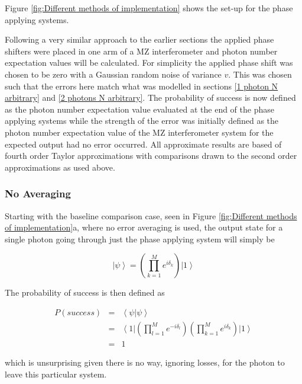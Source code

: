 \documentclass[aps,pra,twocolumn,superscriptaddress,numerical]{revtex4-1}
\begin{document}
		Figure \ref{fig:Different methods of implementation} shows the set-up for the phase applying systems.
		
		Following a very similar approach to the earlier sections the applied phase shifters were placed in one arm of a MZ interferometer and photon number expectation values will be calculated. For simplicity the applied phase shift was chosen to be zero with a Gaussian random noise of variance $v$. This was chosen such that the errors here match what was modelled in sections \ref{1 photon N arbitrary} and \ref{2 photons N arbitrary}. The probability of success is now defined as the photon number expectation value evaluated at the end of the phase applying systems while the strength of the error was initially defined as the photon number expectation value of the MZ interferometer system for the expected output had no error occurred. All approximate results are based of fourth order Taylor approximations with comparisons drawn to the second order approximations as used above.
		
		
		\subsubsection{No Averaging\label{No Averaging}}
		
		Starting with the baseline comparison case, seen in Figure \ref{fig:Different methods of implementation}a, where no error averaging is used, the output state for a single photon going through just the phase applying system will simply be
		
		\begin{equation}
		\left|\psi\right\rangle =\left(\prod_{k=1}^{M}e^{i\delta_{k}}\right)\left|1\right\rangle \label{eq:noAvPhaseState}
		\end{equation}
		
		
		The probability of success is then defined as
		
		\begin{eqnarray}
		P\left(success\right) & = & \left\langle \psi|\psi\right\rangle \nonumber \\
		& = & \left\langle 1\right|\left(\prod_{l=1}^{M}e^{-i\delta_{l}}\right)\left(\prod_{k=1}^{M}e^{i\delta_{k}}\right)\left|1\right\rangle \nonumber \\
		& = & 1\label{eq:noAveProbSuccess}
		\end{eqnarray}
		
		
		which is unsurprising given there is no way, ignoring losses, for the photon to leave this particular system.
		
\end{document}
